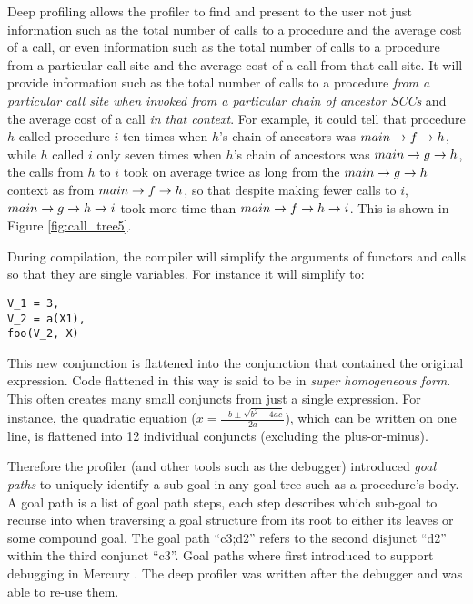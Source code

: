 Deep profiling allows the profiler to find and present to the user
not just information such as the total number of calls to a procedure
and the average cost of a call,
or even information such as the total number of calls to a procedure
from a particular call site and the average cost of a call from that call
site.
It will provide information such as the total number of calls to a procedure
\emph{from a particular call site
when invoked from a particular chain of ancestor SCCs}
and the average cost of a call \emph{in that context}.
For example, it could tell that
procedure $h$ called procedure $i$ ten times
when $h$'s chain of ancestors was $main \rightarrow f \rightarrow h$,
while $h$ called $i$ only seven times
when $h$'s chain of ancestors was $main \rightarrow g \rightarrow h$,
the calls from $h$ to $i$ took on average twice as long
from the $main \rightarrow g \rightarrow h$ context as from $main \rightarrow f \rightarrow h$,
so that despite making fewer calls to $i$,
$main \rightarrow g \rightarrow h \rightarrow i$ took more time than $main \rightarrow f \rightarrow h \rightarrow i$.
This is shown in Figure \ref{fig:call_tree5}.


During compilation, the compiler will simplify the arguments of functors and
calls so that they are single variables.
For instance it will simplify  to:

\begin{verbatim}
V_1 = 3,
V_2 = a(X1),
foo(V_2, X)
\end{verbatim}

\noindent
This new conjunction is flattened into the conjunction that contained the
original expression.
Code flattened in this way is said to be in
\emph{super homogeneous form}.
This often creates many small conjuncts from just a single expression.
For instance, the quadratic equation
($x=\frac{-b \pm \sqrt {b^2-4ac}}{2a}$), which can be written on one line,
is flattened into 12 individual conjuncts (excluding the plus-or-minus).

Therefore the profiler
(and other tools such as the debugger) introduced \emph{goal paths}
to uniquely identify a sub goal in any goal tree such as a procedure's
body.
A goal path is a list of goal path steps, each step describes which
sub-goal to recurse into when traversing a goal structure from its root
to either its leaves or some compound goal.
The goal path ``c3;d2'' refers to the second disjunct ``d2'' within the
third conjunct ``c3''.
Goal paths where first introduced to support debugging in Mercury \citep{mdb}.
The deep profiler was written after the debugger and was able to re-use them.

